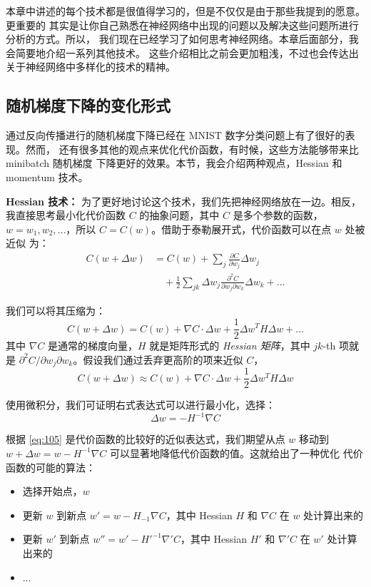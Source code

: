 本章中讲述的每个技术都是很值得学习的，但是不仅仅是由于那些我提到的愿意。更重要的
其实是让你自己熟悉在神经网络中出现的问题以及解决这些问题所进行分析的方式。所以，
我们现在已经学习了如何思考神经网络。本章后面部分，我会简要地介绍一系列其他技术。
这些介绍相比之前会更加粗浅，不过也会传达出关于神经网络中多样化的技术的精神。

\subsection{随机梯度下降的变化形式}

通过反向传播进行的随机梯度下降已经在 MNIST 数字分类问题上有了很好的表现。然而，
还有很多其他的观点来优化代价函数，有时候，这些方法能够带来比 minibatch 随机梯度
下降更好的效果。本节，我会介绍两种观点，Hessian 和 momentum 技术。

\textbf{Hessian 技术：} 为了更好地讨论这个技术，我们先把神经网络放在一边。相反，
我直接思考最小化代价函数 $C$ 的抽象问题，其中 $C$ 是多个参数的函数，
$w=w_1,w_2,...$，所以 $C=C(w)$。借助于泰勒展开式，代价函数可以在点 $w$ 处被近似
为：
\begin{align}
  C(w+\Delta w) &= C(w) + \sum_j \frac{\partial C}{\partial w_j} \Delta w_j \nonumber \\
     & \quad + \frac{1}{2} \sum_{jk} \Delta w_j \frac{\partial^2 C}{\partial w_j \partial w_k} \Delta w_k + \ldots \label{eq:103}\tag{103}
\end{align}

我们可以将其压缩为：
\begin{equation}
  C(w+\Delta w) = C(w) + \nabla C \cdot \Delta w +
  \frac{1}{2} \Delta w^T H \Delta w + \ldots
  \label{eq:104}\tag{104}
\end{equation}
其中 $\nabla C$ 是通常的梯度向量，$H$ 就是矩阵形式的 \emph{Hessian 矩阵}，其中 $jk$-th
项就是 $\partial^2 C/\partial w_j\partial w_k$。假设我们通过丢弃更高阶的项来近似
$C$，
\begin{equation} 
  C(w+\Delta w) \approx C(w) + \nabla C \cdot \Delta w +
  \frac{1}{2} \Delta w^T H \Delta w
  \label{eq:105}\tag{105}
\end{equation}

使用微积分，我们可证明右式表达式可以进行最小化，选择：
\begin{equation}
  \Delta w = -H^{-1} \nabla C
  \label{eq:106}\tag{106}
\end{equation}

根据 \eqref{eq:105} 是代价函数的比较好的近似表达式，我们期望从点 $w$ 移动到
$w+\Delta w = w - H^{-1}\nabla C$ 可以显著地降低代价函数的值。这就给出了一种优化
代价函数的可能的算法：
\begin{itemize}
\item 选择开始点，$w$
\item 更新 $w$ 到新点 $w' = w - H_{-1}\nabla C$，其中 Hessian $H$ 和 $\nabla C$
  在 $w$ 处计算出来的
\item 更新 $w'$ 到新点 $w'' = w' - H'^{-1}\nabla' C$，其中 Hessian $H'$ 和
  $\nabla' C$ 在 $w'$ 处计算出来的
\item $\ldots$
\end{itemize}

